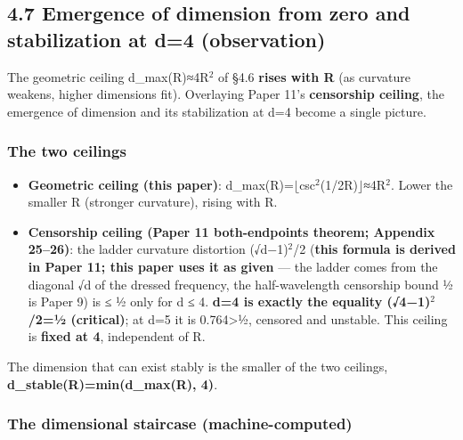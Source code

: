 \documentclass[
]{ltjsarticle}
\providecommand{\tightlist}{%
  \setlength{\itemsep}{0pt}\setlength{\parskip}{0pt}}
\begin{document}
\subsection{4.7 Emergence of dimension from zero and stabilization at
d=4
(observation)}\label{emergence-of-dimension-from-zero-and-stabilization-at-d4-observation}

The geometric ceiling d\_max(R)≈4R\(^{2}\) of §4.6 \textbf{rises with R}
(as curvature weakens, higher dimensions fit). Overlaying Paper 11's
\textbf{censorship ceiling}, the emergence of dimension and its
stabilization at d=4 become a single picture.

\subsubsection{The two ceilings}\label{the-two-ceilings}

\begin{itemize}
\tightlist
\item
  \textbf{Geometric ceiling (this paper)}:
  d\_max(R)=\(\lfloor\)csc\(^{2}\)(1/2R)\(\rfloor\)≈4R\(^{2}\). Lower
  the smaller R (stronger curvature), rising with R.
\item
  \textbf{Censorship ceiling (Paper 11 both-endpoints theorem; Appendix
  25--26)}: the ladder curvature distortion (√d−1)\(^{2}\)/2
  (\textbf{this formula is derived in Paper 11; this paper uses it as
  given} --- the ladder comes from the diagonal √d of the dressed
  frequency, the half-wavelength censorship bound ½ is Paper 9) is ≤ ½
  only for d ≤ 4. \textbf{d=4 is exactly the equality (√4−1)\(^{2}\)/2=½
  (critical)}; at d=5 it is 0.764\textgreater½, censored and unstable.
  This ceiling is \textbf{fixed at 4}, independent of R.
\end{itemize}

The dimension that can exist stably is the smaller of the two ceilings,
\textbf{d\_stable(R)=min(d\_max(R), 4)}.

\subsubsection{The dimensional staircase
(machine-computed)}\label{the-dimensional-staircase-machine-computed}
\end{document}
